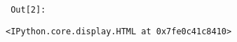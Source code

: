 \par\vspace{1\smallerfontscale}%
    
        {\par%
        \vspace{-1\smallerfontscale}%
        \noindent%
        \begin{minipage}{\cellleftmargin}%
    \hfill%
    {\smaller%
    \tt%
    \color{nbframe-out-prompt}%
    Out[2]:}%
    \hspace{\inputpadding}%
    \hspace{0em}%
    \hspace{3pt}%
    \end{minipage}%
        }%
    \begin{addmargin}[\cellleftmargin]{0em}%
    {\smaller%
    \vspace{-1\smallerfontscale}%
    
    
    
    \begin{verbatim}
<IPython.core.display.HTML at 0x7fe0c41c8410>
    \end{verbatim}

    
}%
    \end{addmargin}%
